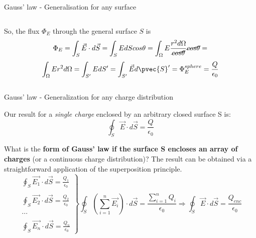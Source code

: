\begin{frame}{Gauss' law - Generalisation for any surface}
\begin{columns}
\begin{column}{0.66\textwidth}
     So, the flux $\Phi_E$ through the general surface $S$ is
     \begin{equation*}
       \Phi_E = \int_{S} \vec{E} \cdot d\vec{S} = \int_{S} E dS cos\theta
          = \int_{\Omega} E \frac{r^{2} d\Omega}{\cancel{cos\theta}} \cancel{cos\theta} =
     \end{equation*}
     \begin{equation*}
        \int_{\Omega} E r^{2} d\Omega = \int_{S^{\prime}} E dS^{\prime}
        = \int_{S^{\prime}} \vec{E} d\pvec{S}' = \Phi_E^{sphere} = \frac{Q}{\epsilon_0}
     \end{equation*}
  \end{column}
\end{columns}
\end{frame}


%
%
%

\begin{frame}{Gauss' law - Generalization for any charge distribution}


Our result for a {\em single charge} enclosed by an arbitrary closed surface S is:
\begin{equation*}
   \oint_{S} \vec{E} \cdot d\vec{S} = \frac{Q}{\epsilon_0}
\end{equation*}

What is the {\bf form of Gauss' law if the surface S encloses an array of charges} (or a continuous charge distribution)?
The result can be obtained via a straightforward application of the superposition principle.\\

\begin{equation*}
  \left.
     \begin{array}{l}
      \oint_{S} \vec{E_{1}} \cdot d\vec{S} = \frac{Q_{1}}{\epsilon_0}\\
      \\
      \oint_{S} \vec{E_{2}} \cdot d\vec{S} = \frac{Q_{2}}{\epsilon_0}\\
      \\
      ...                                                      \\
      \\
      \oint_{S} \vec{E_{n}} \cdot d\vec{S} = \frac{Q_{n}}{\epsilon_0}
     \end{array}
  \right\}
  \oint_{S} (\sum_{i=1}^{n}\vec{E_{i}}) \cdot d\vec{S} = \frac{\sum_{i=1}^{n}Q_{i}}{\epsilon_0} \Rightarrow
  \oint_{S} \vec{E} \cdot d\vec{S} = \frac{Q_{enc}}{\epsilon_0}
\end{equation*}

\end{frame}



